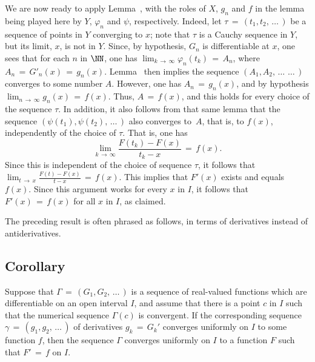         We are now ready to apply Lemma~, with the roles of $X$, $g_{n}$ and $f$ in the lemma being played here by $Y$, ${\varphi}_{n}$ and ${\psi}$, respectively.
    Indeed, let ${\tau} \,=\, (t_{1},t_{2},\,{\ldots}\,)$ be a sequence of points in $Y$ converging to $x$; note that ${\tau}$ is a Cauchy sequence in $Y$, but its limit, $x$, is not in $Y$.
    Since, by hypothesis, $G_{n}$ is differentiable at $x$, one sees that for each $n$ in ${\NN}$, one has $\lim_{k \,{\rightarrow}\, {\infty}} {\varphi}_{n}(t_{k}) \,=\, A_{n}$, where $A_{n} \,=\, G'_{n}(x) \,=\, g_{n}(x)$.
    Lemma~ then implies the sequence $(A_{1},A_{2},\,{\ldots}\,\,{\ldots}\,)$ converges to some number $A$.
    However, one has $A_{n} \,=\, g_{n}(x)$, and by hypothesis $\lim_{n \,{\rightarrow}\, {\infty}} g_{n}(x) \,=\, f(x)$.
    Thus, $A \,=\, f(x)$, and this holds for every choice of the sequence ${\tau}$.
    In addition, it also follows from that same lemma that the sequence $({\psi}(t_{1}),{\psi}(t_{2}),\,{\ldots}\,)$ also converges to~$A$, that is, to $f(x)$, independently of the choice of ${\tau}$.
    That is, one has
        \begin{displaymath}
        \lim_{k \,{\rightarrow}\, {\infty}} \frac{F(t_{k})-F(x)}{t_{k}-x} \,=\, f(x).
        \end{displaymath}
    Since this is independent of the choice of sequence ${\tau}$, it follows that ${\displaystyle \lim_{t \,{\rightarrow}\, x} \frac{F(t)-F(x)}{t-x}} \,=\, f(x)$.
    This implies that $F'(x)$ exists and equals $f(x)$. Since this argument works for every $x$ in $I$, it follows that $F'(x) \,=\, f(x)$ for all $x$ in $I$, as claimed.

\V

        The preceding result is often phrased as follows, in terms of derivatives instead of antiderivatives.

\V

            \subsection{\small{\bf Corollary}}
            \label{CorF05.100}

\V

        Suppose that ${\Gamma} \,=\, (G_{1},G_{2},\,{\ldots}\,)$ is a sequence of real-valued functions which are differentiable on an open interval $I$,
    and assume that there is a point $c$ in $I$ such that the numerical sequence ${\Gamma}(c)$ is convergent.
    If the corresponding sequence ${\gamma} \,=\, (g_{1},g_{2},\,{\ldots}\,)$ of derivatives $g_{k} \,=\, G_{k}'$ converges uniformly on $I$ to some function $f$,
    then the sequence ${\Gamma}$ converges uniformly on $I$ to a function $F$ such that $F' \,=\, f$ on $I$.

